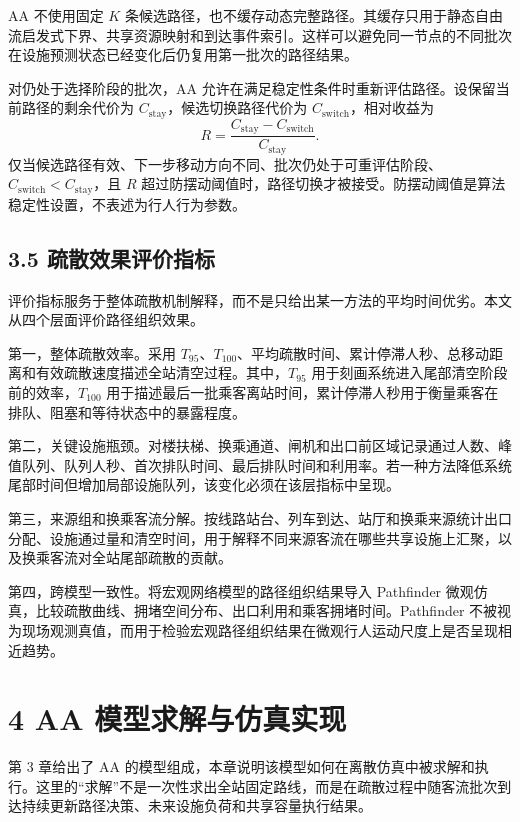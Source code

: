 \documentclass[UTF8,a4paper,12pt]{ctexart}
\begin{document}
AA 不使用固定 \(K\) 条候选路径，也不缓存动态完整路径。其缓存只用于静态自由流启发式下界、共享资源映射和到达事件索引。这样可以避免同一节点的不同批次在设施预测状态已经变化后仍复用第一批次的路径结果。

对仍处于选择阶段的批次，AA 允许在满足稳定性条件时重新评估路径。设保留当前路径的剩余代价为 \(C_{\mathrm{stay}}\)，候选切换路径代价为 \(C_{\mathrm{switch}}\)，相对收益为
\[
R=\frac{C_{\mathrm{stay}}-C_{\mathrm{switch}}}{C_{\mathrm{stay}}}.
\]
仅当候选路径有效、下一步移动方向不同、批次仍处于可重评估阶段、\(C_{\mathrm{switch}}<C_{\mathrm{stay}}\)，且 \(R\) 超过防摆动阈值时，路径切换才被接受。防摆动阈值是算法稳定性设置，不表述为行人行为参数。

\subsection{3.5 疏散效果评价指标}

评价指标服务于整体疏散机制解释，而不是只给出某一方法的平均时间优劣。本文从四个层面评价路径组织效果。

第一，整体疏散效率。采用 \(T_{95}\)、\(T_{100}\)、平均疏散时间、累计停滞人秒、总移动距离和有效疏散速度描述全站清空过程。其中，\(T_{95}\) 用于刻画系统进入尾部清空阶段前的效率，\(T_{100}\) 用于描述最后一批乘客离站时间，累计停滞人秒用于衡量乘客在排队、阻塞和等待状态中的暴露程度。

第二，关键设施瓶颈。对楼扶梯、换乘通道、闸机和出口前区域记录通过人数、峰值队列、队列人秒、首次排队时间、最后排队时间和利用率。若一种方法降低系统尾部时间但增加局部设施队列，该变化必须在该层指标中呈现。

第三，来源组和换乘客流分解。按线路站台、列车到达、站厅和换乘来源统计出口分配、设施通过量和清空时间，用于解释不同来源客流在哪些共享设施上汇聚，以及换乘客流对全站尾部疏散的贡献。

第四，跨模型一致性。将宏观网络模型的路径组织结果导入 Pathfinder 微观仿真，比较疏散曲线、拥堵空间分布、出口利用和乘客拥堵时间。Pathfinder 不被视为现场观测真值，而用于检验宏观路径组织结果在微观行人运动尺度上是否呈现相近趋势。

\section{4 AA 模型求解与仿真实现}

第 3 章给出了 AA 的模型组成，本章说明该模型如何在离散仿真中被求解和执行。这里的“求解”不是一次性求出全站固定路线，而是在疏散过程中随客流批次到达持续更新路径决策、未来设施负荷和共享容量执行结果。
\end{document}

